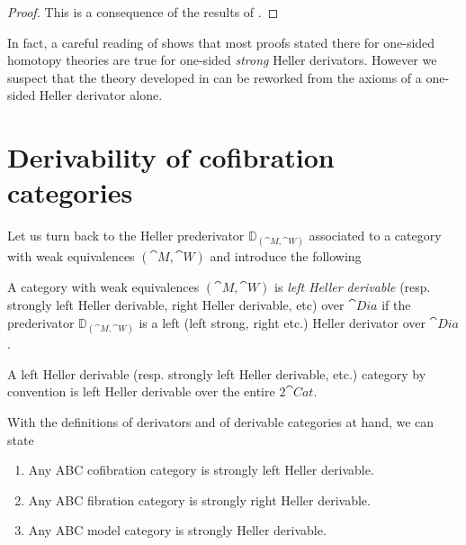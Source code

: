 \begin{proof}
This is a consequence of the results of \cite{Heller}. 
\end{proof}

In fact, a careful reading of \cite{Heller} shows that most proofs stated there for one-sided homotopy theories are true for one-sided {\it strong} Heller derivators. However we suspect that the theory developed in \cite{Heller} can be reworked from the axioms of a one-sided Heller derivator alone. 

\section{Derivability of cofibration categories}
\label{sec:derivability}
Let us turn back to the Heller prederivator ${\mathbb D}_{({\cat M}, {\cat W})}$ associated to a category with weak equivalences $({\cat M}, {\cat W})$ and introduce the following

\begin{defn}
\label{defn:derivablecat}
A category with weak equivalences $({\cat M}, {\cat W})$ is {\it left Heller derivable} (resp. strongly left Heller derivable, right Heller derivable, etc) over ${\cat Dia}$ if the prederivator ${\mathbb D}_{({\cat M}, {\cat W})}$ is a left (left strong, right etc.) Heller derivator over ${\cat Dia}$.
\end{defn}

A left Heller derivable (resp. strongly left Heller derivable, etc.) category by convention is left Heller derivable over the entire $2{\cat Cat}$. 

With the definitions of derivators and of derivable categories at hand, we can state

\begin{thm}[Cisinski]
\label{thm:cofcatderivator}
\mbox{}
\begin{enumerate}
\item
Any ABC cofibration category is strongly left Heller derivable.
\item
Any ABC fibration category is strongly right Heller derivable.
\item
Any ABC model category is strongly Heller derivable.
\end{enumerate}
\end{thm}

